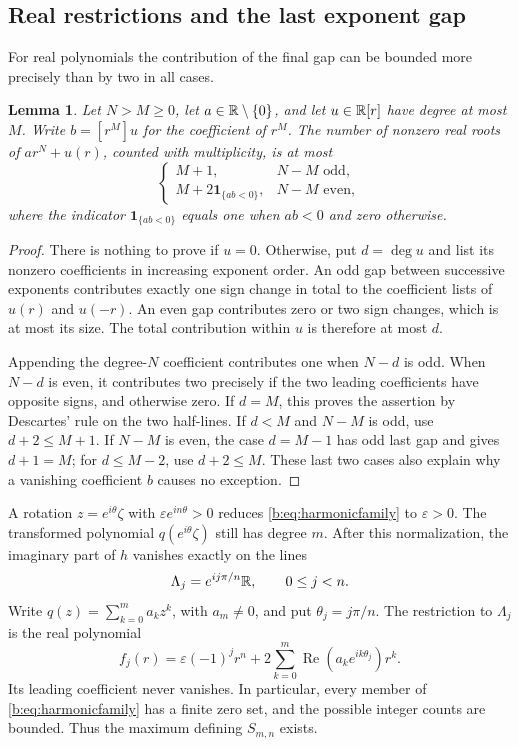 \documentclass[UTF8,11pt]{ctexart}
\newtheorem{lem}[thm]{Lemma}
\theoremstyle{definition}
\numberwithin{equation}{section}
\DeclareMathOperator{\Rea}{Re}\DeclareMathOperator{\Ima}{Im}
\begin{document}
\subsection{Real restrictions and the last exponent gap}
For real polynomials the contribution of the final gap can be
bounded more precisely than by two in all cases.
\begin{lem}\label{b:lem:harmonicgap}
Let $N>M\ge0$, let $a\in\mathbb R\setminus\{0\}$, and let
$u\in\mathbb R[r]$ have degree at most $M$. Write $b=[r^M]u$ for the
coefficient of $r^M$. The number of nonzero real roots of
$ar^N+u(r)$, counted with multiplicity, is at most
\[
 \begin{cases}
  M+1,&N-M\text{ odd},\\
  M+2\mathbf1_{\{ab<0\}},&N-M\text{ even},
 \end{cases}
\]
where the indicator $\mathbf1_{\{ab<0\}}$ equals one when $ab<0$
and zero otherwise.
\end{lem}
\begin{proof}
There is nothing to prove if $u=0$. Otherwise, put $d=\deg u$ and
list its nonzero coefficients in increasing exponent order.
An odd gap between successive exponents contributes exactly one
sign change in total to the coefficient lists of $u(r)$ and
$u(-r)$. An even gap contributes zero or two sign changes, which
is at most its size. The total contribution within $u$ is
therefore at most $d$.

Appending the degree-$N$ coefficient contributes one when $N-d$
is odd. When $N-d$ is even, it contributes two precisely if the
two leading coefficients have opposite signs, and otherwise zero.
If $d=M$, this proves the assertion by Descartes' rule on the two
half-lines. If $d<M$ and $N-M$ is odd, use $d+2\le M+1$.
If $N-M$ is even, the case $d=M-1$ has odd last gap and gives
$d+1=M$; for $d\le M-2$, use $d+2\le M$. These last two cases
also explain why a vanishing coefficient $b$ causes no exception.
\end{proof}

A rotation $z=e^{i\theta}\zeta$ with
$\varepsilon e^{in\theta}>0$ reduces \eqref{b:eq:harmonicfamily} to
$\varepsilon>0$. The transformed polynomial $q(e^{i\theta}\zeta)$
still has degree $m$. After this normalization, the imaginary part
of $h$ vanishes exactly on the lines
\begin{equation}\label{b:eq:harmoniclines}
 \Lambda_j=e^{ij\pi/n}\mathbb R,\qquad 0\le j<n.
\end{equation}
Write $q(z)=\sum_{k=0}^m a_kz^k$, with $a_m\ne0$, and put
$\theta_j=j\pi/n$. The restriction to $\Lambda_j$ is the real
polynomial
\begin{equation}\label{b:eq:harmonicrestriction}
 f_j(r)=\varepsilon(-1)^jr^n+
             2\sum_{k=0}^m\Rea(a_ke^{ik\theta_j})r^k.
\end{equation}
Its leading coefficient never vanishes. In particular, every member
of \eqref{b:eq:harmonicfamily} has a finite zero set, and the possible
integer counts are bounded. Thus the maximum defining $S_{m,n}$
exists.
\end{document}
